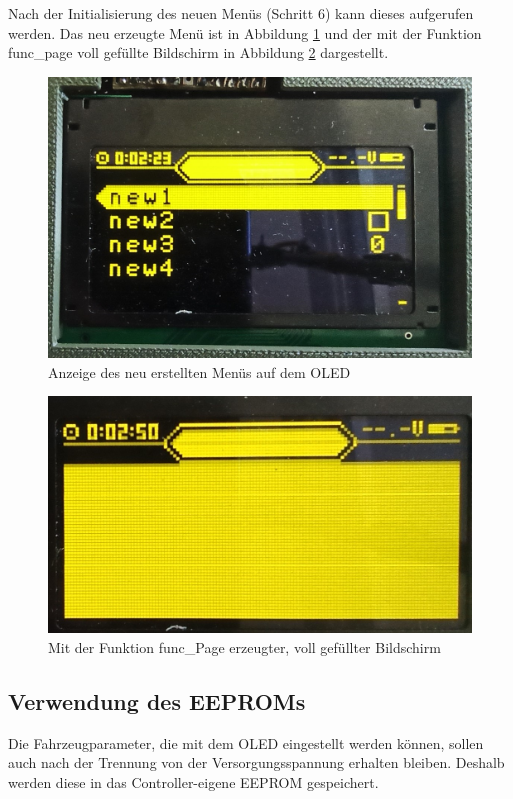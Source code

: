 Nach der Initialisierung des neuen Menüs (Schritt 6) kann dieses aufgerufen werden. Das neu erzeugte Menü ist in Abbildung \ref{fig:NewMenu} und der mit der Funktion \glqq func\_page\grqq{} voll gefüllte Bildschirm in Abbildung \ref{fig:funcPage} dargestellt.

\begin{figure}[H] %
\includegraphics[width=.75\textwidth]{sec6/images/NewMenu} 
\centering
\captionsetup{width=.95\textwidth}
\caption[Anzeige des neu erstellten Menüs auf dem \ac{OLED}ü]{Anzeige des neu erstellten Menüs auf dem \ac{OLED}}\centering
\label{fig:NewMenu}
\end{figure}
\begin{figure}[H] %
\includegraphics[width=.75\textwidth]{sec6/images/funcPage} 
\centering
\captionsetup{width=.95\textwidth}
\caption[Mit der Funktion \glqq func\_Page\grqq{} erzeugter, voll gefüllter Bildschirm]{Mit der Funktion \glqq func\_Page\grqq{} erzeugter, voll gefüllter Bildschirm}\centering
\label{fig:funcPage}
\end{figure}

\subsection{Verwendung des \aclp{EEPROM}}\label{sec:EEPROM}
Die Fahrzeugparameter, die mit dem \ac{OLED} eingestellt werden können, sollen auch nach der Trennung von der Versorgungsspannung erhalten bleiben. Deshalb werden diese in das Controller-eigene \ac{EEPROM} gespeichert.\vspace{11pt}

